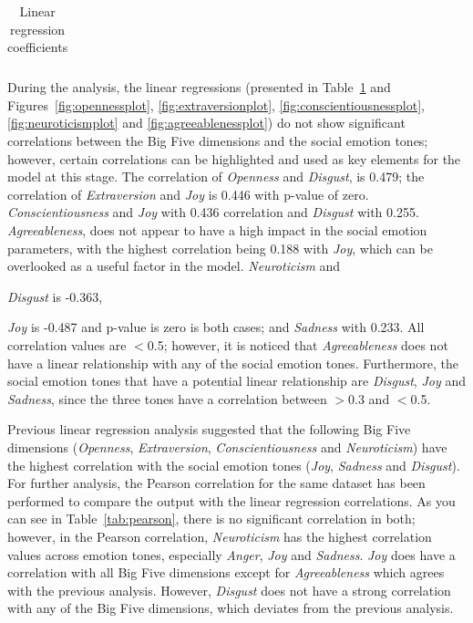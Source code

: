 \documentclass[graybox]{svmult}
\begin{document}
{\begin{table}[ht]
{\begin{tabular}{@{}llll|lll|lll|lll|lll@{}}
\bottomrule

\end{tabular}%
}
\caption{Linear regression coefficients}
\label{tbl:linreg}
\end{table}

During the analysis, the linear regressions (presented in
Table~\ref{tbl:linreg} and Figures~\ref{fig:opennessplot},
\ref{fig:extraversionplot}, \ref{fig:conscientiousnessplot},
\ref{fig:neuroticismplot} and \ref{fig:agreeablenessplot}) do not show
significant correlations between the Big Five dimensions and the
social emotion tones; however, certain correlations can be highlighted
and used as key elements for the model at this stage. The correlation
of {\emph{Openness} and {\emph{Disgust}}, is 0.479; the correlation of
{\emph{Extraversion}} and {\emph{Joy}} is 0.446 with p-value of
zero. {\emph{Conscientiousness}} and {\emph{Joy}} with 0.436
correlation and \emph{Disgust}} with 0.255. {\emph{Agreeableness}},
does not appear to have a high impact in the social emotion
parameters, with the highest correlation being 0.188 with
{\emph{Joy}}, which can be overlooked as a useful factor in the
model. {\emph{Neuroticism}} and {\emph{Disgust} is -0.363, {\emph{Joy}
is -0.487 and p-value is zero is both cases; and {\emph{Sadness}} with
0.233. All correlation values are $<$0.5; however, it is noticed that
{\emph{Agreeableness}} does not have a linear relationship with any of
the social emotion tones. Furthermore, the social emotion tones that
have a potential linear relationship are {\emph{Disgust}},
{\emph{Joy}} and {\emph{Sadness}}, since the three tones have a
correlation between $>$0.3 and $<$0.5.

Previous linear regression analysis suggested that the following Big
Five dimensions ({\emph{Openness}}, {\emph{Extraversion}},
{\emph{Conscientiousness}} and {\emph{Neuroticism}}) have the highest
correlation with the social emotion tones ({\emph{Joy}},
{\emph{Sadness}} and {\emph{Disgust}}). For further analysis, the
Pearson correlation for the same dataset has been performed to compare
the output with the linear regression correlations. As you can see in
Table~\ref{tab:pearson}, there is no significant correlation in both;
however, in the Pearson correlation, {\emph{Neuroticism}} has the
highest correlation values across emotion tones, especially
{\emph{Anger}}, {\emph{Joy}} and {\emph{Sadness}}. {\emph{Joy}} does
have a correlation with all Big Five dimensions except for
{\emph{Agreeableness}} which agrees with the previous
analysis. However, {\emph{Disgust}} does not have a strong correlation
with any of the Big Five dimensions, which deviates from the previous
analysis.

}}}
\end{document}
